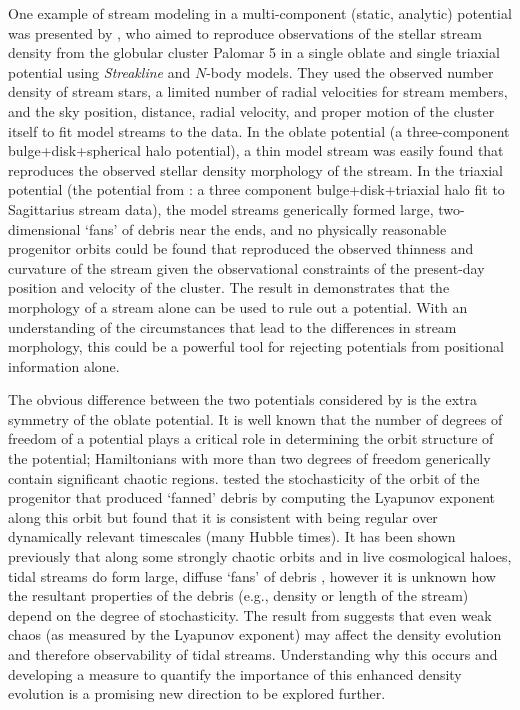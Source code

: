 One example of stream modeling in a multi-component (static, analytic) potential
was presented by \citet{pearson15}, who aimed to reproduce observations of the
stellar stream density from the globular cluster Palomar 5 in a single oblate
and single triaxial potential using \emph{Streakline} \citep{kuepper12} and
$N$-body models. They used the observed number density of stream stars, a limited
number of radial velocities for stream members, and the sky position, distance,
radial velocity, and proper motion of the cluster itself to fit model streams to
the data. In the oblate potential (a three-component bulge+disk+spherical halo
potential), a thin model stream was easily found that reproduces the observed
stellar density morphology of the stream. In the triaxial potential (the
potential from \cite{law10}: a three component bulge+disk+triaxial halo fit to
Sagittarius stream data), the model streams generically formed large,
two-dimensional `fans' of debris near the ends, and no physically reasonable
progenitor orbits could be found that reproduced the observed thinness and
curvature of the stream given the observational constraints of the present-day
position and velocity of the cluster. The result in \citet{pearson15}
demonstrates that the morphology of a stream alone can be used to rule out a
potential. With an understanding of the circumstances that lead to the
differences in stream morphology, this could be a powerful tool for rejecting
potentials from positional information alone.

The obvious difference between the two potentials considered by
\citet{pearson15} is the extra symmetry of the oblate potential. It is well
known that the number of degrees of freedom of a potential plays a critical role
in determining the orbit structure of the potential; Hamiltonians with more than
two degrees of freedom generically contain significant chaotic regions.
\citet{pearson15} tested the stochasticity of the orbit of the progenitor that
produced `fanned' debris by computing the Lyapunov exponent along this orbit but
found that it is consistent with being regular over dynamically relevant
timescales (many Hubble times). It has been shown previously that along some
strongly chaotic orbits and in live cosmological haloes, tidal streams do form
large, diffuse `fans' of debris \citep[e.g.,][]{fardal14, ngan15}, however it is
unknown how the resultant properties of the debris (e.g., density or length of
the stream) depend on the degree of stochasticity. The result from
\citet{pearson15} suggests that even weak chaos (as measured by the Lyapunov
exponent) may affect the density evolution and therefore observability of tidal
streams. Understanding why this occurs and developing a measure to quantify the
importance of this enhanced density evolution is a promising new direction to be
explored further.


